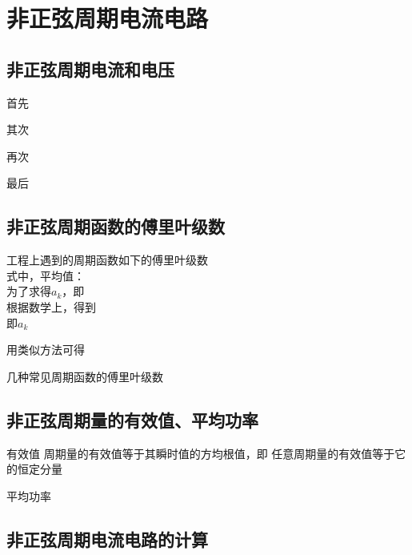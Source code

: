 \chapter{非正弦周期电流电路}

\section{非正弦周期电流和电压}
首先

其次

再次

最后

\section{非正弦周期函数的傅里叶级数}
工程上遇到的周期函数如下的傅里叶级数
\[
\]
式中，平均值：
\[
\]
为了求得$a_k$，即
\[
\]
根据数学上，得到
\[
\]
即$a_k$

用类似方法可得
\[
\]

几种常见周期函数的傅里叶级数

\section{非正弦周期量的有效值、平均功率}
有效值
周期量的有效值等于其瞬时值的方均根值，即
任意周期量的有效值等于它的恒定分量

平均功率

\section{非正弦周期电流电路的计算}